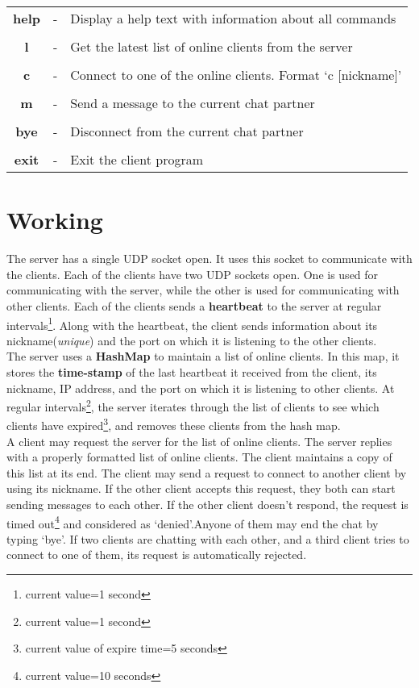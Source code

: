 \documentclass{article}
\begin{document}
	\begin{center}
		\begin{tabular}{ >{\bfseries}c c l }
			help & - & Display a help text with information about all commands \\\\
			l & - & Get the latest list of online clients from the server \\\\
			c & - & Connect to one of the online clients. Format `c [nickname]' \\\\
			m & - & Send a message to the current chat partner \\\\
			bye & - & Disconnect from the current chat partner \\\\
			exit & - & Exit the client program
		\end{tabular}
	\end{center}

	\newpage
	\section{Working}
	The server has a single UDP socket open. It uses this socket to communicate with the clients. Each of the clients have two UDP sockets open. One is used for communicating with the server, while the other is used for communicating with other clients. Each of the clients sends a \textbf{heartbeat} to the server at regular intervals\footnote{current value=1 second}. Along with the heartbeat, the client sends information about its nickname(\textit{unique}) and the port on which it is listening to the other clients.\\

	The server uses a \textbf{HashMap} to maintain a list of online clients. In this map, it stores the \textbf{time-stamp} of the last heartbeat it received from the client, its nickname, IP address, and the port on which it is listening to other clients.
	At regular intervals\footnote{current value=1 second}, the server iterates through the list of clients to see which clients have expired\footnote{current value of expire time=5 seconds}, and removes these clients from the hash map.\\

	A client may request the server for the list of online clients. The server replies with a properly formatted list of online clients. The client maintains a copy of this list at its end. The client may send a request to connect to another client by using its nickname. If the other client accepts this request, they both can start sending messages to each other. If the other client doesn't respond, the request is timed out\footnote{current value=10 seconds} and considered as `denied'.Anyone of them may end the chat by typing `bye'.
	If two clients are chatting with each other, and a third client tries to connect to one of them, its request is automatically rejected.\\
\end{document}
